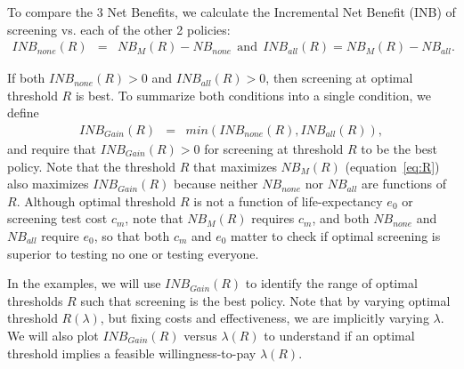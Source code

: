 \documentclass[AMA,STIX1COL]{WileyNJD-v2}
\begin{document}
To compare the 3 Net Benefits, we calculate the Incremental Net Benefit (INB) of screening vs. each of the other 2 policies:
\begin{eqnarray*}
	I\!N\!B_{none}(R) &=& N\!B_M(R)-N\!B_{none}~~\mathrm{and}~~ I\!N\!B_{all}(R) = N\!B_M(R)-N\!B_{all}.
\end{eqnarray*}

If both $I\!N\!B_{none}(R)>0$ and $I\!N\!B_{all}(R)>0$, then screening at optimal threshold $R$ is best. To summarize both conditions into a single condition, we define
\begin{eqnarray}
\label{eq:INB_Gain}
	I\!N\!B_{Gain}(R) &=& min(I\!N\!B_{none}(R),I\!N\!B_{all}(R)),	
\end{eqnarray}
and require that $I\!N\!B_{Gain}(R)>0$ for screening at threshold $R$ to be the best policy.  Note that the threshold $R$ that maximizes $N\!B_M(R)$ (equation~\ref{eq:R}) also maximizes $I\!N\!B_{Gain}(R)$ because neither $N\!B_{none}$ nor $N\!B_{all}$ are functions of $R$.  Although optimal threshold $R$ is not a function of life-expectancy $e_0$ or screening test cost $c_m$, note that $N\!B_M(R)$ requires $c_m$, and both $N\!B_{none}$ and $N\!B_{all}$ require $e_0$, so that both $c_m$ and $e_0$ matter to check if optimal screening is superior to testing no one or testing everyone.

In the examples, we will use $I\!N\!B_{Gain}(R)$ to identify the range of optimal thresholds $R$ such that screening is the best policy.  Note that by varying optimal threshold $R(\lambda)$, but fixing costs and effectiveness, we are implicitly varying $\lambda$.   We will also plot $I\!N\!B_{Gain}(R)$ versus $\lambda(R)$ to understand if an optimal threshold implies a feasible willingness-to-pay $\lambda(R)$.

\end{document}
